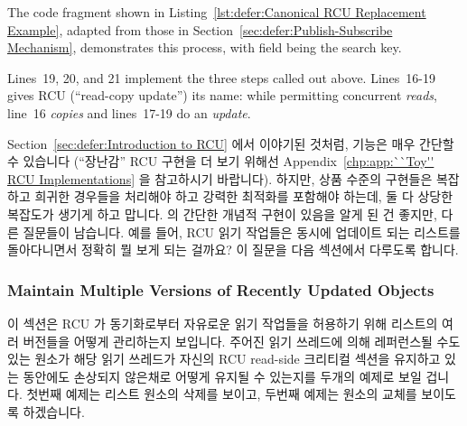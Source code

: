 The code fragment shown in
Listing~\ref{lst:defer:Canonical RCU Replacement Example},
adapted from those in Section~\ref{sec:defer:Publish-Subscribe Mechanism},
demonstrates this process, with field  being the search key.

Lines~19, 20, and 21 implement the three steps called out above.
Lines~16-19 gives RCU (``read-copy update'') its name: while permitting
concurrent \emph{reads}, line~16 \emph{copies} and lines~17-19
do an \emph{update}.
\fi

Section~\ref{sec:defer:Introduction to RCU} 에서 이야기된 것처럼,
 기능은 매우 간단할 수 있습니다 (``장난감'' RCU 구현을 더
보기 위해선
Appendix~\ref{chp:app:``Toy'' RCU Implementations} 을 참고하시기
바랍니다).
하지만, 상품 수준의 구현들은 복잡하고 희귀한 경우들을 처리해야 하고 강력한
최적화를 포함해야 하는데, 둘 다 상당한 복잡도가 생기게 하고 맙니다.
 의 간단한 개념적 구현이 있음을 알게 된 건 좋지만, 다른
질문들이 남습니다.
예를 들어, RCU 읽기 작업들은 동시에 업데이트 되는 리스트를 돌아다니면서 정확히
뭘 보게 되는 걸까요?
이 질문을 다음 섹션에서 다루도록 합니다.

\subsubsection{Maintain Multiple Versions of Recently Updated Objects}
\label{sec:defer:Maintain Multiple Versions of Recently Updated Objects}

이 섹션은 RCU 가 동기화로부터 자유로운 읽기 작업들을 허용하기 위해 리스트의
여러 버전들을 어떻게 관리하는지 보입니다.
주어진 읽기 쓰레드에 의해 레퍼런스될 수도 있는 원소가 해당 읽기 쓰레드가 자신의
RCU read-side 크리티컬 섹션을 유지하고 있는 동안에도 손상되지 않은채로 어떻게
유지될 수 있는지를 두개의 예제로 보일 겁니다.
첫번째 예제는 리스트 원소의 삭제를 보이고, 두번째 예제는 원소의 교체를 보이도록
하겠습니다.
\iffalse

